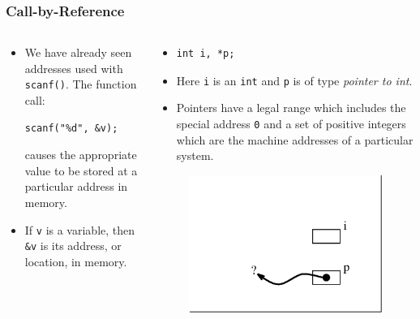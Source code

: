 \begin{frame}[fragile]
\frametitle{Call-by-Reference}
\begin{columns}[T]

\begin{column}{0.45\textwidth}
\begin{itemize}[<+->]
\item We have already seen addresses used with \verb^scanf()^.
The function call:
\begin{verbatim}
scanf("%d", &v);
\end{verbatim}
causes the appropriate value to be stored at a particular
address in memory.
\item If \verb^v^ is  a variable, then \verb^&v^ is its
address, or location, in memory.
\end{itemize}
\end{column}

\pause
\begin{column}{0.45\textwidth}
\begin{itemize}[<+->]
\item
\begin{verbatim}
int i, *p;
\end{verbatim}
\item Here \verb^i^ is an \verb^int^ and \verb^p^ is of type
{\it pointer to int}.
\item Pointers have a legal range which
includes the special address \verb^0^ and a set of positive
integers which are the machine addresses of a particular
system.
\end{itemize}
\begin{center}
\begin{figure}[h]
\centerline{
\includegraphics[scale=0.40]{../Figs/point8_1.eps}
}
\end{figure}
\end{center}
\end{column}

\end{columns}
\end{frame}

